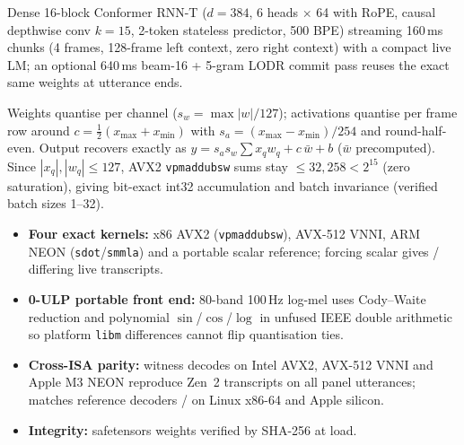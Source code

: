 \documentclass[letterpaper]{article}
\begin{document}
\noindent
\begin{minipage}[t]{0.486\textwidth}
  \vspace{0pt}
  {\fontsize{8.0}{10.0}\selectfont
  Dense 16-block Conformer RNN-T ($d{=}384$, 6 heads $\times$ 64 with RoPE, causal depthwise conv $k{=}15$, 2-token stateless predictor, 500 BPE) streaming 160\,ms chunks (4 frames, 128-frame left context, zero right context) with a compact live LM; an optional 640\,ms beam-16 + 5-gram LODR commit pass reuses the exact same weights at utterance ends.

  \vspace{2pt}
  Weights quantise per channel ($s_w=\max|w|/127$); activations quantise per frame row around $c=\tfrac12(x_{\max}+x_{\min})$ with $s_a=(x_{\max}-x_{\min})/254$ and round-half-even. Output recovers exactly as $y = s_a s_w\sum x_q w_q + c\,\bar w + b$ ($\bar w$ precomputed). Since $|x_q|,|w_q|\le 127$, AVX2 \texttt{vpmaddubsw} sums stay $\le 32{,}258 < 2^{15}$ (zero saturation), giving bit-exact int32 accumulation and batch invariance (verified batch sizes 1--32).
  }
\end{minipage}\hfill
\begin{minipage}[t]{0.486\textwidth}
  \vspace{0pt}
  {\fontsize{8.0}{10.0}\selectfont
  \begin{itemize}[leftmargin=1.12em,itemsep=1.4pt,topsep=1pt]
    \item \textbf{Four exact kernels:} x86 AVX2 (\texttt{vpmaddubsw}), AVX-512 VNNI, ARM NEON (\texttt{sdot}/\texttt{smmla}) and a portable scalar reference; forcing scalar gives \ScalarDiffs/\ScalarUtts{} differing live transcripts.
    \item \textbf{0-ULP portable front end:} 80-band 100\,Hz log-mel uses Cody--Waite reduction and polynomial $\sin$/$\cos$/$\log$ in unfused IEEE double arithmetic so platform \texttt{libm} differences cannot flip quantisation ties.
    \item \textbf{Cross-ISA parity:} \CandIsaRuns{} witness decodes on Intel AVX2, AVX-512 VNNI and Apple M3 NEON reproduce Zen~2 transcripts on all \ScalarUtts{} panel utterances; \releasever{} matches reference decoders \ScalarUtts/\ScalarUtts{} on Linux x86-64 and Apple silicon.
    \item \textbf{Integrity:} safetensors weights verified by SHA-256 at load.
  \end{itemize}
  }
\end{minipage}
\end{document}
